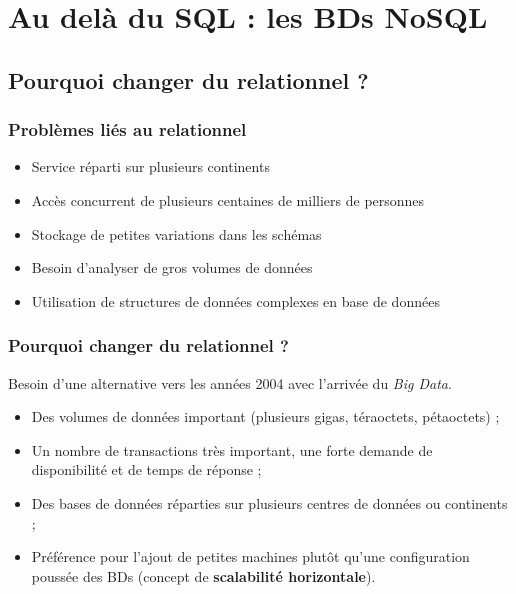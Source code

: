 \section{Au delà du SQL : les BDs NoSQL}

    \subsection{Pourquoi changer du relationnel ?}
    \begin{frame}
        \frametitle{Problèmes liés au relationnel}

        \begin{itemize}
            \item Service réparti sur plusieurs continents
            \item Accès concurrent de plusieurs centaines de milliers de personnes
            \item Stockage de petites variations dans les schémas
            \item Besoin d'analyser de gros volumes de données
            \item Utilisation de structures de données complexes en base de données
        \end{itemize}
    \end{frame}

    \begin{frame}
        \frametitle{Pourquoi changer du relationnel ?}

        Besoin d'une alternative vers les années 2004 avec l'arrivée du \textit{Big Data}.
        \begin{itemize}
            \item Des volumes de données important (plusieurs gigas, téraoctets, pétaoctets) ;
            \item Un nombre de transactions très important, une forte demande de disponibilité et de temps de réponse ;
            \item Des bases de données réparties sur plusieurs centres de données ou continents ;
            \item Préférence pour l'ajout de petites machines plutôt qu'une configuration poussée des BDs (concept de \textbf{scalabilité horizontale}).
        \end{itemize}
    \end{frame}

